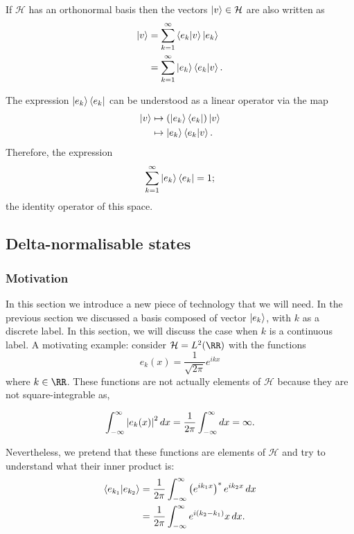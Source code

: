 \documentclass[12pt, a4paper]{article}
\begin{document}
\begin{corollary}
    If \(\mathcal{H}\) has an orthonormal basis then the vectors \(\ket{v} \in \mathcal{H}\) are also written as 
    \[\begin{aligned}
        \ket{v} &= \sum_{k=1}^{\infty} \bra{e_k} \ket{v} \ket{e_k} \\
        &= \sum_{k=1}^{\infty} \ket{e_k} \bra{e_k}\ket{v}.
    \end{aligned}\]
\end{corollary}

\begin{mdremark}
    The expression \(\ket{e_k} \bra{e_k}\) can be understood as a linear operator via the map 
    \[\begin{aligned}
        \ket{v} &\mapsto \left( \ket{e_k} \bra{e_k} \right) \ket{v}\\
        &\mapsto \ket{e_k} \bra{e_k} \ket{v}.
    \end{aligned}\]
    Therefore, the expression 
    \[\sum_{k=1}^{\infty} \ket{e_k}\bra{e_k}=1;\]
    the identity operator of this space.
\end{mdremark}

\subsection{Delta-normalisable states}

\subsubsection{Motivation}

In this section we introduce a new piece of technology that we will need. In the previous section we discussed a basis composed of vector \(\ket{e_k} \), with \(k\) as a discrete label. In this section, we will discuss the case when \(k\) is a continuous label. A motivating example: consider \(\mathcal{H} = L^2(\RR)\) with the functions 
\[e_k(x)= \frac{1}{\sqrt{2\pi}} e^{ikx}\]
where \(k \in \RR\). These functions are not actually elements of \(\mathcal{H}\) because they are not square-integrable as,

\[\int_{-\infty}^{\infty} \abs{e_k(x)}^2 \, dx = \frac{1}{2\pi} \int_{-\infty}^{\infty} dx = \infty.\]

Nevertheless, we pretend that these functions are elements of \(\mathcal{H}\) and try to understand what their inner product is:
\[\begin{aligned}
    \bra{e_{k_1}} \ket{e_{k_2}} &= \frac{1}{2\pi} \int_{-\infty}^{\infty} \left( e^{ik_1 x} \right)^* e^{ik_2 x} \, dx \\
    &= \frac{1}{2\pi} \int_{-\infty}^{\infty} e^{i(k_2-k_1)}x \, dx.
\end{aligned}\]
\end{document}
